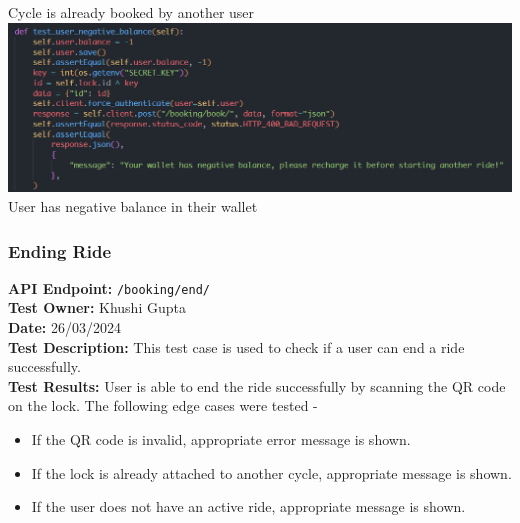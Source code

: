 \documentclass[11pt]{article}
\begin{document}
\begin{center}
    Cycle is already booked by another user\\
    \includegraphics[scale=0.5]{unit_testing_codes/start_ride_5.png}
    User has negative balance in their wallet
\end{center}


\subsubsection{Ending Ride}
\textbf{API Endpoint: } \texttt{/booking/end/} \\
\textbf{Test Owner: } Khushi Gupta \\
\textbf{Date: } 26/03/2024 \\
\textbf{Test Description: } This test case is used to check if a user can end a ride successfully. \\
\textbf{Test Results: } User is able to end the ride successfully by scanning the QR code on the lock. The following edge cases were tested -
\begin{itemize}
    \itemsep 0em
    \item If the QR code is invalid, appropriate error message is shown.
    \item If the lock is already attached to another cycle, appropriate message is shown.
    \item If the user does not have an active ride, appropriate message is shown.
\end{itemize}
\end{document}
